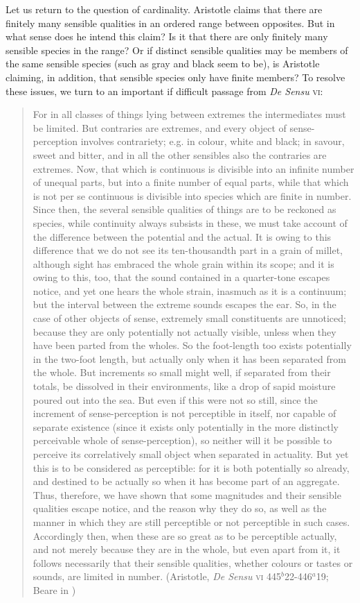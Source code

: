 Let us return to the question of cardinality. Aristotle claims that there are finitely many sensible qualities in an ordered range between opposites. But in what sense does he intend this claim? Is it that there are only finitely many sensible species in the range? Or if distinct sensible qualities may be members of the same sensible species (such as gray and black seem to be), is Aristotle claiming, in addition, that sensible species only have finite members? To resolve these issues, we turn to an important if difficult passage from \emph{De Sensu} \textsc{vi}:
\begin{quote}
	For in all classes of things lying between extremes the intermediates must be limited. But contraries are extremes, and every object of sense-perception involves contrariety; e.g. in colour, white and black; in savour, sweet and bitter, and in all the other sensibles also the contraries are extremes. Now, that which is continuous is divisible into an infinite number of unequal parts, but into a finite number of equal parts, while that which is not per se continuous is divisible into species which are finite in number. Since then, the several sensible qualities of things are to be reckoned as species, while continuity always subsists in these, we must take account of the difference between the potential and the actual. It is owing to this difference that we do not see its ten-thousandth part in a grain of millet, although sight has embraced the whole grain within its scope; and it is owing to this, too, that the sound contained in a quarter-tone escapes notice, and yet one hears the whole strain, inasmuch as it is a continuum; but the interval between the extreme sounds escapes the ear. So, in the case of other objects of sense, extremely small constituents are unnoticed; because they are only potentially not actually visible, unless when they have been parted from the wholes. So the foot-length too exists potentially in the two-foot length, but actually only when it has been separated from the whole. But increments so small might well, if separated from their totals, be dissolved in their environments, like a drop of sapid moisture poured out into the sea. But even if this were not so still, since the increment of sense-perception is not perceptible in itself, nor capable of separate existence (since it exists only potentially in the more distinctly perceivable whole of sense-perception), so neither will it be possible to perceive its correlatively small object when separated in actuality. But yet this is to be considered as perceptible: for it is both potentially so already, and destined to be actually so when it has become part of an aggregate. Thus, therefore, we have shown that some magnitudes and their sensible qualities escape notice, and the reason why they do so, as well as the manner in which they are still perceptible or not perceptible in such cases. Accordingly then, when these are so great as to be perceptible actually, and not merely because they are in the whole, but even apart from it, it follows necessarily that their sensible qualities, whether colours or tastes or sounds, are limited in number. (Aristotle, \emph{De Sensu} \textsc{vi} 445\( ^{b} \)22-446\( ^{a} \)19; Beare in \citealt[18]{Barnes:1984uq})
\end{quote}

